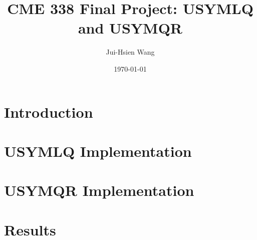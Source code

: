 \documentclass[10pt,letterpaper]{article}
\begin{document}
\linespread{1} %
\small \normalsize %
\title{CME 338 Final Project: USYMLQ and USYMQR}
\date{\today}
\author{Jui-Hsien Wang}
\maketitle
\section{Introduction}

\section{USYMLQ Implementation} 



\section{USYMQR Implementation} 

\section{Results} 
\end{document}
